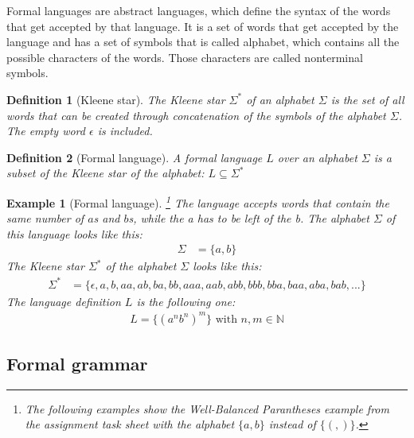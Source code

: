 \documentclass[a4paper, 11pt]{article}
\newtheorem*{example*}{Example}
\newtheorem*{definition*}{Definition}
\begin{document}
Formal languages are abstract languages, which define the syntax of the words that get accepted by that language. It is a set of words that get accepted by the language and has a set of symbols that is called alphabet, which contains all the possible characters of the words. Those characters are called nonterminal symbols. \cite{CNF, language}

\begin{definition*}[Kleene star]
The Kleene star $\Sigma^*$ of an alphabet $\Sigma$ is the set of all words that can be created through concatenation of the symbols of the alphabet $\Sigma$. The empty word $\epsilon$ is included. 
\end{definition*}

\begin{definition*}[Formal language]
A formal language $L$ over an alphabet $\Sigma$ is a subset of the Kleene star of the alphabet: $L \subseteq \Sigma^*$
\end{definition*}


\begin{example*}[Formal language]\footnote{The following examples show the \textit{Well-Balanced Parantheses} example from the assignment task sheet with the alphabet $\{a, b\}$ instead of $\{(, )\}$. } The language accepts words that contain the same number of $a$s and $b$s, while the a has to be left of the b. 
The alphabet $\Sigma$ of this language looks like this:
\begin{align*}
\Sigma & = \{ a, b\}
\end{align*}
The Kleene star $\Sigma^*$ of the alphabet $\Sigma$ looks like this:
\begin{align*}
\Sigma^* & = \{ \epsilon, a, b, aa, ab, ba, bb, aaa, aab, abb, bbb, bba, baa, aba, bab, ...   \}
\end{align*}
The language definition $L$ is the following one:
\begin{align*}
L = \{ (a^{n}b^{n})^m \} \text{ with } n, m \in \mathbb{N}
\end{align*}

\end{example*}




\subsection{Formal grammar}
\label{formalgrammar}
\end{document}
